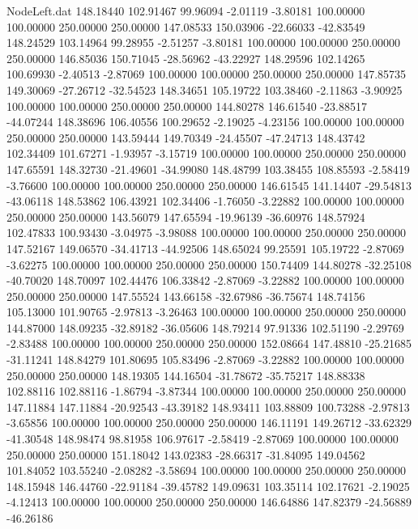 \begin{filecontents}{NodeLeft.dat}
 148.18440  102.91467   99.96094    -2.01119   -3.80181  100.00000  100.00000  250.00000  250.00000  147.08533  150.03906  -22.66033  -42.83549
 148.24529  103.14964   99.28955    -2.51257   -3.80181  100.00000  100.00000  250.00000  250.00000  146.85036  150.71045  -28.56962  -43.22927
 148.29596  102.14265  100.69930    -2.40513   -2.87069  100.00000  100.00000  250.00000  250.00000  147.85735  149.30069  -27.26712  -32.54523
 148.34651  105.19722  103.38460    -2.11863   -3.90925  100.00000  100.00000  250.00000  250.00000  144.80278  146.61540  -23.88517  -44.07244
 148.38696  106.40556  100.29652    -2.19025   -4.23156  100.00000  100.00000  250.00000  250.00000  143.59444  149.70349  -24.45507  -47.24713
 148.43742  102.34409  101.67271    -1.93957   -3.15719  100.00000  100.00000  250.00000  250.00000  147.65591  148.32730  -21.49601  -34.99080
 148.48799  103.38455  108.85593    -2.58419   -3.76600  100.00000  100.00000  250.00000  250.00000  146.61545  141.14407  -29.54813  -43.06118
 148.53862  106.43921  102.34406    -1.76050   -3.22882  100.00000  100.00000  250.00000  250.00000  143.56079  147.65594  -19.96139  -36.60976
 148.57924  102.47833  100.93430    -3.04975   -3.98088  100.00000  100.00000  250.00000  250.00000  147.52167  149.06570  -34.41713  -44.92506
 148.65024   99.25591  105.19722    -2.87069   -3.62275  100.00000  100.00000  250.00000  250.00000  150.74409  144.80278  -32.25108  -40.70020
 148.70097  102.44476  106.33842    -2.87069   -3.22882  100.00000  100.00000  250.00000  250.00000  147.55524  143.66158  -32.67986  -36.75674
 148.74156  105.13000  101.90765    -2.97813   -3.26463  100.00000  100.00000  250.00000  250.00000  144.87000  148.09235  -32.89182  -36.05606
 148.79214   97.91336  102.51190    -2.29769   -2.83488  100.00000  100.00000  250.00000  250.00000  152.08664  147.48810  -25.21685  -31.11241
 148.84279  101.80695  105.83496    -2.87069   -3.22882  100.00000  100.00000  250.00000  250.00000  148.19305  144.16504  -31.78672  -35.75217
 148.88338  102.88116  102.88116    -1.86794   -3.87344  100.00000  100.00000  250.00000  250.00000  147.11884  147.11884  -20.92543  -43.39182
 148.93411  103.88809  100.73288    -2.97813   -3.65856  100.00000  100.00000  250.00000  250.00000  146.11191  149.26712  -33.62329  -41.30548
 148.98474   98.81958  106.97617    -2.58419   -2.87069  100.00000  100.00000  250.00000  250.00000  151.18042  143.02383  -28.66317  -31.84095
 149.04562  101.84052  103.55240    -2.08282   -3.58694  100.00000  100.00000  250.00000  250.00000  148.15948  146.44760  -22.91184  -39.45782
 149.09631  103.35114  102.17621    -2.19025   -4.12413  100.00000  100.00000  250.00000  250.00000  146.64886  147.82379  -24.56889  -46.26186

\end{filecontents}
